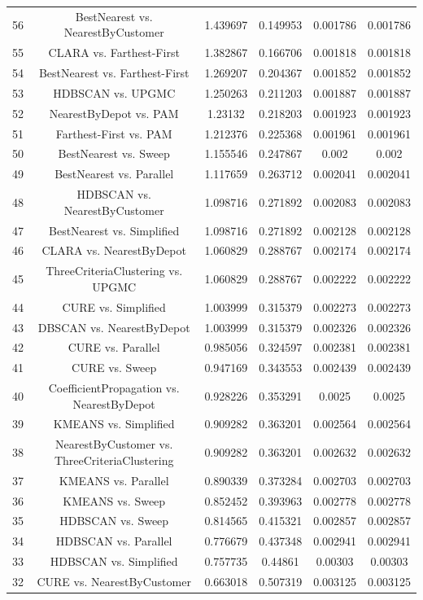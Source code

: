 \documentclass[a4paper,10pt]{article}
\begin{document}
\begin{landscape}
\begin{table}[!htp]
\begin{tabular}{cccccc}
56&BestNearest vs. NearestByCustomer&1.439697&0.149953&0.001786&0.001786\\
55&CLARA vs. Farthest-First&1.382867&0.166706&0.001818&0.001818\\
54&BestNearest vs. Farthest-First&1.269207&0.204367&0.001852&0.001852\\
53&HDBSCAN vs. UPGMC&1.250263&0.211203&0.001887&0.001887\\
52&NearestByDepot vs. PAM&1.23132&0.218203&0.001923&0.001923\\
51&Farthest-First vs. PAM&1.212376&0.225368&0.001961&0.001961\\
50&BestNearest vs. Sweep&1.155546&0.247867&0.002&0.002\\
49&BestNearest vs. Parallel&1.117659&0.263712&0.002041&0.002041\\
48&HDBSCAN vs. NearestByCustomer&1.098716&0.271892&0.002083&0.002083\\
47&BestNearest vs. Simplified&1.098716&0.271892&0.002128&0.002128\\
46&CLARA vs. NearestByDepot&1.060829&0.288767&0.002174&0.002174\\
45&ThreeCriteriaClustering vs. UPGMC&1.060829&0.288767&0.002222&0.002222\\
44&CURE vs. Simplified&1.003999&0.315379&0.002273&0.002273\\
43&DBSCAN vs. NearestByDepot&1.003999&0.315379&0.002326&0.002326\\
42&CURE vs. Parallel&0.985056&0.324597&0.002381&0.002381\\
41&CURE vs. Sweep&0.947169&0.343553&0.002439&0.002439\\
40&CoefficientPropagation vs. NearestByDepot&0.928226&0.353291&0.0025&0.0025\\
39&KMEANS vs. Simplified&0.909282&0.363201&0.002564&0.002564\\
38&NearestByCustomer vs. ThreeCriteriaClustering&0.909282&0.363201&0.002632&0.002632\\
37&KMEANS vs. Parallel&0.890339&0.373284&0.002703&0.002703\\
36&KMEANS vs. Sweep&0.852452&0.393963&0.002778&0.002778\\
35&HDBSCAN vs. Sweep&0.814565&0.415321&0.002857&0.002857\\
34&HDBSCAN vs. Parallel&0.776679&0.437348&0.002941&0.002941\\
33&HDBSCAN vs. Simplified&0.757735&0.44861&0.00303&0.00303\\
32&CURE vs. NearestByCustomer&0.663018&0.507319&0.003125&0.003125\\

\end{tabular}
\end{table}
\end{landscape}
\end{document}
